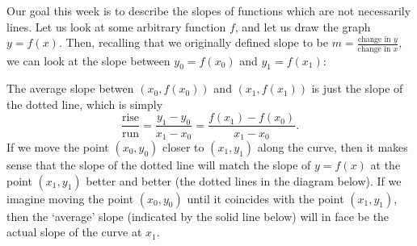 Our goal this week is to describe the slopes of functions which are not necessarily lines. Let us look at some arbitrary function $ f $,
and let us draw the graph $ y = f(x) $. Then, recalling that we originally defined slope to be $ m = \frac{\text{change in } y}{\text{change in } x} $,
we can look at the slope between $ y_0 = f(x_0) $ and $ y_1 = f(x_1) $:
\begin{center}
\end{center}
The average slope betwen $ (x_0, f(x_0)) $ and $ (x_1, f(x_1)) $ is just the slope of the dotted line, which is simply
\begin{displaymath}
  \frac{\text{rise}}{\text{run}} = \frac{y_1 - y_0}{x_1 - x_0} = \frac{f(x_1) - f(x_0)}{x_1 - x_0}.
\end{displaymath}
If we move the point $ (x_0, y_0) $ closer to $ (x_1, y_1) $ along the curve, then it makes sense that the slope of the dotted line will
match the slope of $ y = f(x) $ at the point $ (x_1, y_1) $ better and better (the dotted lines in the diagram below). If we imagine moving
the point $ (x_0, y_0 ) $ until it coincides with the point $ (x_1, y_1) $, then the `average' slope (indicated by the solid line below) will
in face be the actual slope of the curve at $ x_1 $.
